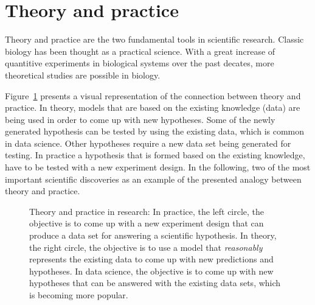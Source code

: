 \section{Theory and practice}
\label{sec:theoryandpractice}

Theory and practice are the two fundamental tools in scientific research. 
Classic biology has been thought as a practical science.
With a great increase of quantitive experiments in biological systems over the past decates, more theoretical studies are possible in biology.

Figure~\ref{fig:1} presents a visual representation of the connection between theory and practice.
In theory, models that are based on the existing knowledge (data) are being used in order to come up with new hypotheses. 
Some of the newly generated hypothesis can be tested by using the existing data, which is common in data science.
Other hypotheses require a new data set being generated for testing.
In practice a hypothesis that is formed based on the existing knowledge, have to be tested with a new experiment design.
In the following, two of the most important scientific discoveries as an example of the presented analogy between theory and practice.

\begin{figure}
	\centering 
	 \caption[Theory and practice]{Theory and practice in research: 
	 	In practice, the left circle, the objective is to come up with a new experiment design that can produce a data set for answering a scientific hypothesis. 
	 	In theory, the right circle, the objective is to use a model that \textit{reasonably} represents the existing data to come up with new predictions and hypotheses. 
	 	In data science, the objective is to come up with new hypotheses that can be answered with the existing data sets, which is becoming more popular.}
	 \label{fig:1}
\end{figure}

